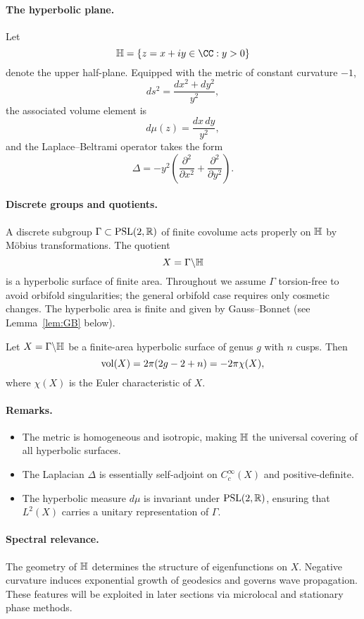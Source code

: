 \paragraph{The hyperbolic plane.}
Let 
\[
\HH = \{ z = x+iy \in \CC : y > 0 \}
\]
denote the upper half-plane. Equipped with the metric of constant curvature $-1$,
\[
ds^2 = \frac{dx^2+dy^2}{y^2},
\]
the associated volume element is
\[
d\mu(z) = \frac{dx\,dy}{y^2},
\]
and the Laplace--Beltrami operator takes the form
\[
\Delta = -y^2\left( \frac{\partial^2}{\partial x^2} + \frac{\partial^2}{\partial y^2}\right).
\]

\paragraph{Discrete groups and quotients.}
A discrete subgroup $\Gamma \subset \mathrm{PSL}(2,\mathbb{R})$ of finite covolume acts properly on $\mathbb{H}$ by Möbius transformations. The quotient
\[
X = \Gamma\backslash\mathbb{H}
\]
is a hyperbolic surface of finite area. Throughout we assume $\Gamma$ torsion-free to avoid orbifold singularities; the general orbifold case requires only cosmetic changes. The hyperbolic area is finite and given by Gauss--Bonnet (see Lemma~\ref{lem:GB} below).

\begin{lemma}\label{lem:GB}
Let $X = \Gamma\backslash\mathbb{H}$ be a finite-area hyperbolic surface of genus $g$ with $n$ cusps. Then
\[
\operatorname{vol}(X) = 2\pi(2g-2+n) = -2\pi\chi(X),
\]
where $\chi(X)$ is the Euler characteristic of $X$.
\end{lemma}

\paragraph{Remarks.}
\begin{itemize}
  \item The metric is homogeneous and isotropic, making $\mathbb{H}$ the universal covering of all hyperbolic surfaces.
  \item The Laplacian $\Delta$ is essentially self-adjoint on $C_c^\infty(X)$ and positive-definite.
  \item The hyperbolic measure $d\mu$ is invariant under $\mathrm{PSL}(2,\mathbb{R})$, ensuring that $L^2(X)$ carries a unitary representation of $\Gamma$.
\end{itemize}

\paragraph{Spectral relevance.}
The geometry of $\mathbb{H}$ determines the structure of eigenfunctions on $X$. Negative curvature induces exponential growth of geodesics and governs wave propagation. These features will be exploited in later sections via microlocal and stationary phase methods.

